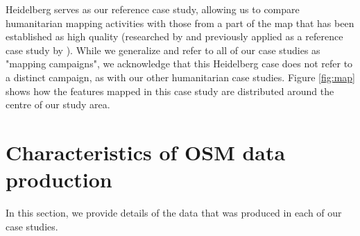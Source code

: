Heidelberg serves as our reference case study, allowing us to compare humanitarian mapping activities with those from a part of the map that has been established as high quality (researched by \textcite{arsanjani_assessing_2013} and previously applied as a reference case study by \textcite{anderson_crowd_2018}). While we generalize and refer to all of our case studies as "mapping campaigns", we acknowledge that this Heidelberg case does not refer to a distinct campaign, as with our other humanitarian case studies. Figure \ref{fig:map} shows how the features mapped in this case study are distributed around the centre of our study area.

\section{Characteristics of OSM data production}

In this section, we provide details of the data that was produced in each of our case studies.

